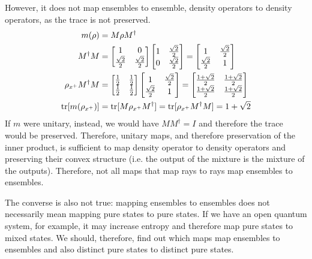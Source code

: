 However, it does not map ensembles to ensemble, density operators to density operators, as the trace is not preserved.
\begin{equation}
	\begin{aligned}
	m(\rho) &= M \rho M^\dagger \\
	M^\dagger M &= \begin{bmatrix} 1 & 0 \\ \frac{\sqrt{2}}{2} & \frac{\sqrt{2}}{2} \end{bmatrix} \begin{bmatrix} 1 & \frac{\sqrt{2}}{2} \\ 0 & \frac{\sqrt{2}}{2} \end{bmatrix} = \begin{bmatrix} 1 & \frac{\sqrt{2}}{2} \\ \frac{\sqrt{2}}{2} & 1 \end{bmatrix} \\
	 \rho_{x^+} M^{\dagger} M &= \begin{bmatrix} \frac{1}{2} & \frac{1}{2}  \\ \frac{1}{2}  & \frac{1}{2}  \end{bmatrix} \begin{bmatrix} 1 & \frac{\sqrt{2}}{2} \\ \frac{\sqrt{2}}{2} & 1 \end{bmatrix} = \begin{bmatrix} \frac{1+ \sqrt{2}}{2} & \frac{1+ \sqrt{2}}{2} \\ \frac{1+ \sqrt{2}}{2} & \frac{1+ \sqrt{2}}{2} \end{bmatrix} \\
	\operatorname{tr}[m(\rho_{x^+})] &= \operatorname{tr}[M \rho_{x^+} M^{\dagger}] = \operatorname{tr}[ \rho_{x^+} M^{\dagger} M] = 1+ \sqrt{2} \\
	\end{aligned}
\end{equation}
If $m$ were unitary, instead, we would have $M M^\dagger = I$ and therefore the trace would be preserved. Therefore, unitary maps, and therefore preservation of the inner product, is sufficient to map density operator to density operators and preserving their convex structure (i.e. the output of the mixture is the mixture of the outputs). Therefore, not all maps that map rays to rays map ensembles to ensembles.

The converse is also not true: mapping ensembles to ensembles does not necessarily mean mapping pure states to pure states. If we have an open quantum system, for example, it may increase entropy and therefore map pure states to mixed states. We should, therefore, find out which maps map ensembles to ensembles and also distinct pure states to distinct pure states.

